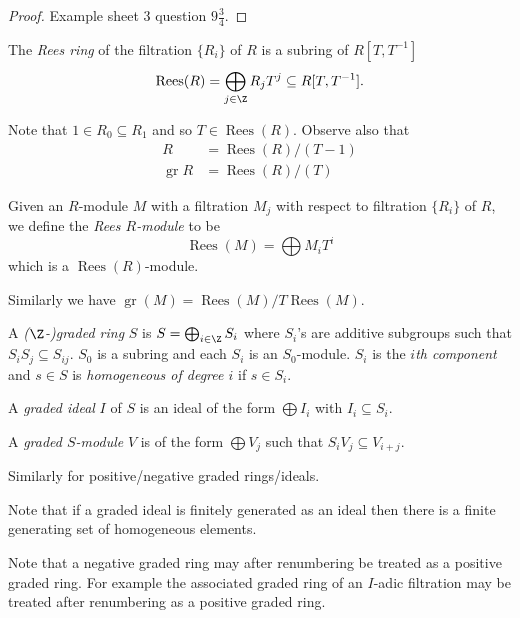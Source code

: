\documentclass[a4paper]{article}
\DeclareMathOperator{\gr}{gr} %
\DeclareMathOperator{\Rees}{Rees} %
\begin{document}
\begin{proof}
  Example sheet 3 question \(9 \frac{3}{4}\).
\end{proof}

\begin{definition}
  The \emph{Rees ring} of the filtration \(\{R_i\}\) of \(R\) is a subring of \(R[T, T^{-1}]\)
  \[
    \Rees(R) = \bigoplus_{j \in \Z} R_j T^j \subseteq R[T, T^{-1}].
  \]
\end{definition}

Note that \(1 \in R_0 \subseteq R_1\) and so \(T \in \Rees(R)\). Observe also that
\begin{align*}
  R &= \Rees (R)/(T - 1) \\
  \gr R &= \Rees (R)/(T)
\end{align*}

\begin{definition}
  Given an \(R\)-module \(M\) with a filtration \(M_j\) with respect to filtration \(\{R_i\}\) of \(R\), we define the \emph{Rees \(R\)-module} to be
  \[
    \Rees(M) = \bigoplus M_i T^i
  \]
  which is a \(\Rees(R)\)-module.
\end{definition}

Similarly we have \(\gr(M) = \Rees(M)/T\Rees(M)\).

\begin{definition}
  A \emph{(\(\Z\)-)graded ring} \(S\) is \(S = \bigoplus_{i \in \Z} S_i\) where \(S_i\)'s are additive subgroups such that \(S_i S_j \subseteq S_{ij}\). \(S_0\) is a subring and each \(S_i\) is an \(S_0\)-module. \(S_i\) is the \emph{\(i\)th component} and \(s \in S\) is \emph{homogeneous of degree \(i\)} if \(s \in S_i\).

  A \emph{graded ideal} \(I\) of \(S\) is an ideal of the form \(\bigoplus I_i\) with \(I_i \subseteq S_i\).

  A \emph{graded \(S\)-module} \(V\) is of the form \(\bigoplus V_j\) such that \(S_i V_j \subseteq V_{i + j}\).

  Similarly for positive/negative graded rings/ideals.
\end{definition}

Note that if a graded ideal is finitely generated as an ideal then there is a finite generating set of homogeneous elements.

Note that a negative graded ring may after renumbering be treated as a positive graded ring. For example the associated graded ring of an \(I\)-adic filtration may be treated after renumbering as a positive graded ring.
\end{document}
